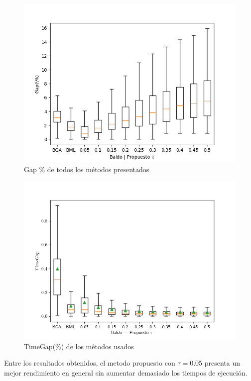 \documentclass[spanish, a4paper, 12pt, openany,final]{book}
\begin{document}
\begin{figure}[H]
	\centering
	\includegraphics[scale=0.7]{graphs/full_gap_comparison.png}
	\caption{Gap \% de todos los métodos presentados}
	\label{fig:full_gap}
\end{figure}

\begin{figure}[H]
	\centering
	\includegraphics[scale=0.7]{graphs/full_timegap_comparison.png}
	\caption{TimeGap(\%) de los métodos usados}
	\label{fig:full_timegap}
\end{figure}


Entre los resultados obtenidos, el metodo propuesto con $\tau = 0.05$ presenta un mejor rendimiento en general sin aumentar demasiado los tiempos de ejecución.
\end{document}
